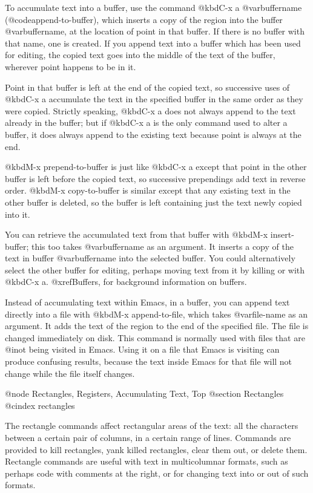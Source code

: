 {{{{{{{{  To accumulate text into a buffer, use the command @kbd{C-x a @var{buffername}}
(@code{append-to-buffer}), which inserts a copy of the region into the
buffer @var{buffername}, at the location of point in that buffer.  If there
is no buffer with that name, one is created.  If you append text into a
buffer which has been used for editing, the copied text goes into the
middle of the text of the buffer, wherever point happens to be in it.

  Point in that buffer is left at the end of the copied text, so successive
uses of @kbd{C-x a} accumulate the text in the specified buffer in the same
order as they were copied.  Strictly speaking, @kbd{C-x a} does not always
append to the text already in the buffer; but if @kbd{C-x a} is the only
command used to alter a buffer, it does always append to the existing text
because point is always at the end.

  @kbd{M-x prepend-to-buffer} is just like @kbd{C-x a} except that point in
the other buffer is left before the copied text, so successive prependings
add text in reverse order.  @kbd{M-x copy-to-buffer} is similar except that
any existing text in the other buffer is deleted, so the buffer is left
containing just the text newly copied into it.

  You can retrieve the accumulated text from that buffer with @kbd{M-x
insert-buffer}; this too takes @var{buffername} as an argument.  It inserts
a copy of the text in buffer @var{buffername} into the selected buffer.
You could alternatively select the other buffer for editing, perhaps moving
text from it by killing or with @kbd{C-x a}.  @xref{Buffers}, for
background information on buffers.

  Instead of accumulating text within Emacs, in a buffer, you can append
text directly into a file with @kbd{M-x append-to-file}, which takes
@var{file-name} as an argument.  It adds the text of the region to the end
of the specified file.  The file is changed immediately on disk. This
command is normally used with files that are @i{not} being visited in
Emacs.  Using it on a file that Emacs is visiting can produce confusing
results, because the text inside Emacs for that file will not change
while the file itself changes.

@node Rectangles, Registers, Accumulating Text, Top
@section Rectangles
@cindex rectangles

  The rectangle commands affect rectangular areas of the text: all the
characters between a certain pair of columns, in a certain range of lines.
Commands are provided to kill rectangles, yank killed rectangles, clear
them out, or delete them.  Rectangle commands are useful with text in
multicolumnar formats, such as perhaps code with comments at the right,
or for changing text into or out of such formats.

}}}}}}}}
